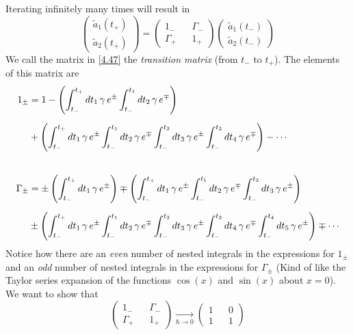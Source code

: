 \documentclass[12pt,a4paper]{article}
\begin{document}
	Iterating infinitely many times will result in
	\begin{equation}
		\begin{pmatrix}
			\tilde{a}_{1}(t_{+}) \\[5pt]
			\tilde{a}_{2}(t_{+})
		\end{pmatrix}
		=
		\begin{pmatrix}
			1_{-} && \Gamma_{-} \\[5pt]
			\Gamma_{+} && 1_{+}	 
		\end{pmatrix}
		\begin{pmatrix}
			\tilde{a}_{1}(t_{-}) \\[5pt]
			\tilde{a}_{2}(t_{-})
		\end{pmatrix} \label{4.47}
	\end{equation}
	We call the matrix in \eqref{4.47} the \emph{transition matrix} (from $t_{-}$ to $t_{+}$). The elements of this matrix are 
	\begin{align}
		1_{\pm} &= 1 - \left( \int_{t_{-}}^{t_{+}} dt_{1}\, \gamma\, e^{\pm} \int_{t_{-}}^{t_{1}} dt_{2}\, \gamma\, e^{\mp} \right) \notag \\[5pt]
		&+ \left( \int_{t_{-}}^{t_{+}} dt_{1}\, \gamma\, e^{\pm} \int_{t_{-}}^{t_{1}} dt_{2}\, \gamma\, e^{\mp} \int_{t_{-}}^{t_{2}} dt_{3}\, \gamma\, e^{\pm} \int_{t_{-}}^{t_{3}} dt_{4}\, \gamma\, e^{\mp} \right) - \cdots \label{4.48} \\[20pt]
		\Gamma_{\pm} &= \pm \left( \int_{t_{-}}^{t_{+}} dt_{1}\, \gamma\, e^{\pm} \right) \mp \left( \int_{t_{-}}^{t_{+}} dt_{1}\, \gamma\, e^{\pm} \int_{t_{-}}^{t_{1}} dt_{2}\, \gamma\, e^{\mp} \int_{t_{-}}^{t_{2}} dt_{3}\, \gamma\, e^{\pm} \right) \notag \\[5pt]
		&\pm \left( \int_{t_{-}}^{t_{+}} dt_{1}\, \gamma\, e^{\pm} \int_{t_{-}}^{t_{1}} dt_{2}\, \gamma\, e^{\mp} \int_{t_{-}}^{t_{2}} dt_{3}\, \gamma\, e^{\pm} \int_{t_{-}}^{t_{3}} dt_{4}\, \gamma\, e^{\mp} \int_{t_{-}}^{t_{4}} dt_{5}\, \gamma\, e^{\pm} \right) \mp \cdots \label{4.49}
	\end{align}
	Notice how there are an \emph{even} number of nested integrals in the expressions for $1_{\pm}$ and an \emph{odd} number of nested integrals in the expressions for $\Gamma_{\pm}$ (Kind of like the Taylor series expansion of the functions $\cos(x)$ and $\sin(x)$ about $x=0$). We want to show that
	\begin{equation}
		\begin{pmatrix}
			1_{-} && \Gamma_{-} \\[5pt]
			\Gamma_{+} && 1_{+}	 
		\end{pmatrix}
		\xrightarrow[\hbar \rightarrow 0]{}
		\begin{pmatrix}
			1 && 0 \\[5pt]
			1 && 1	 
		\end{pmatrix} \label{4.50}
	\end{equation}
\end{document}

